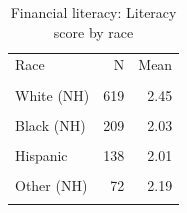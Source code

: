 \begin{table}[htbp]\centering\small
\caption{Financial literacy: Literacy score by race}
\label{tab:finlit_score_by_race_eth}
\begin{tabular}{lrr}\toprule
Race & N & Mean \\\\ \midrule
White (NH) & 619 & 2.45 \\\\
Black (NH) & 209 & 2.03 \\\\
Hispanic & 138 & 2.01 \\\\
Other (NH) & 72 & 2.19 \\\\
\bottomrule
\end{tabular}\end{table}
